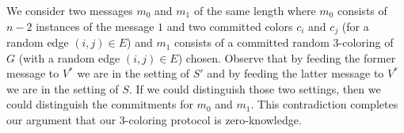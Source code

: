 \documentclass[12pt]{tufte-book}
\providecommand{\DIFaddbegin}{} %
\providecommand{\DIFaddend}{} %
\newcommand{\DIFaddincludegraphics}[2][]{{\color{blue}\fbox{\DIFOincludegraphics[#1]{#2}}}} %
\DeclareRobustCommand{\DIFaddbegin}{\DIFOaddbegin \let\includegraphics\DIFaddincludegraphics} %
\DeclareRobustCommand{\DIFaddend}{\DIFOaddend \let\includegraphics\DIFOincludegraphics} %
\begin{document}
We consider two messages $m_0$ and $m_1$ of the same length where $m_0$ consists of $n-2$ instances of the message $1$ and two committed colors $c_i$ and $c_j$ (for a random edge $(i, j) \in E$) and $m_1$ consists of a committed random 3-coloring of $G$ (with a random edge $(i, j) \in E$) chosen. Observe that by feeding the former message to $V^*$ we are in the setting of $S'$ and by feeding the latter message to $V^*$ we are in the setting of $S$. If we could distinguish those two settings, then we could distinguish the commitments for $m_0$ and $m_1$. This contradiction completes our argument that our 3-coloring protocol is zero-knowledge.
\DIFaddbegin 















\DIFaddend %
%
%
%
%
%
%
%
%



\backmatter
\end{document}
